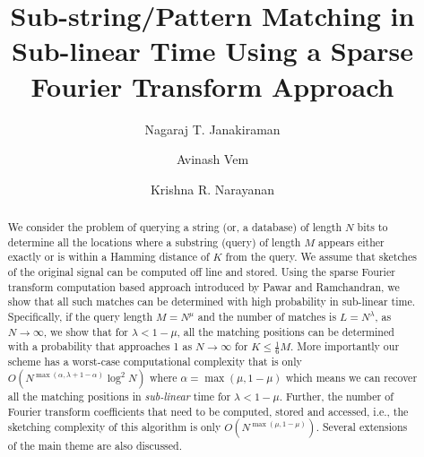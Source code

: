 \documentclass[sigconf]{acmart}
\begin{document}
\title{Sub-string/Pattern Matching in Sub-linear Time Using a Sparse Fourier Transform Approach}


\author{Nagaraj T. Janakiraman}

\author{Avinash Vem}

\author{Krishna R. Narayanan}






\begin{abstract}
	We consider the problem of querying a string (or, a database) of length $N$ bits to determine all the locations where a substring (query) of length $M$ appears either exactly or is within a Hamming distance of $K$ from the query. We assume that sketches of the original signal can be computed off line and stored. Using the sparse Fourier transform computation based approach introduced by Pawar and Ramchandran, we show that all such matches can be determined with high probability in sub-linear time. Specifically, if the query length $M = N^\mu$ and the number of matches is $L=N^\lambda$, as $N \rightarrow \infty$, we show that  for $\lambda < 1-\mu$, all the matching positions can be determined with a probability that approaches 1 as $N \rightarrow \infty$ for $K \leq \frac{1}{6}M$. More importantly our scheme has a worst-case computational complexity that is only $O\left(N^{\max(\alpha,\lambda+1-\alpha)} \log^2 N \right)$ where $\alpha=\max(\mu,1-\mu)$ which means we can recover all the matching positions in {\it sub-linear} time for $\lambda<1-\mu$. Further, the number of Fourier transform coefficients that need to be computed, stored and accessed, i.e., the sketching complexity of this algorithm is only $O\left( N^{\max(\mu,1-\mu)}\right)$. Several extensions of the main theme are also discussed.
\end{abstract}
\end{document}
